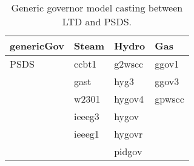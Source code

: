\begin{table}[!ht]
	\centering
	\begin{tabular}{@{} C{2cm} C{2cm} C{2cm} C{2cm}  @{}} 	
		\toprule %
		\footnotesize %
		\raggedright %
	genericGov		&	Steam	&	Hydro	&	Gas	\\		
		\midrule		
PSDS	&	ccbt1	&	g2wscc	& ggov1\\
				&	gast	&	hyg3	& ggov3\\
				&	w2301	&	hygov4	& gpwscc\\
				&	ieeeg3	&	hygov	& \\
				&	ieeeg1	&	hygovr	& \\
				&			& pidgov & \\
		\bottomrule
	\end{tabular}
	\caption{Generic governor model casting between LTD and PSDS.}
	\label{tab:genGovCasting}
\end{table}
